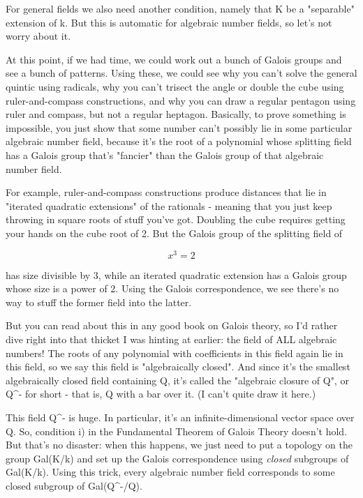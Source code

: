 For general fields we also need another condition, namely that K be a 
"separable" extension of k.  But this is automatic for algebraic number
fields, so let's not worry about it.  

At this point, if we had time, we could work out a bunch of Galois groups
and see a bunch of patterns.  Using these, we could see why you can't
solve the general quintic using radicals, why you can't trisect the angle 
or double the cube using ruler-and-compass constructions, and why you can
draw a regular pentagon using ruler and compass, but not a regular heptagon.
Basically, to prove something is impossible, you just show that some number
can't possibly lie in some particular algebraic number field, because it's 
the root of a polynomial whose splitting field has a Galois group that's 
"fancier" than the Galois group of that algebraic number field.  

For example, ruler-and-compass constructions produce distances that lie in 
"iterated quadratic extensions" of the rationals - meaning that you just 
keep throwing in square roots of stuff you've got.  Doubling the cube 
requires getting your hands on the cube root of 2.  But the Galois group 
of the splitting field of 

$$
x^{3} = 2
$$
    
has size divisible by 3, while an iterated quadratic extension has a Galois
group whose size is a power of 2.  Using the Galois correspondence, we see
there's no way to stuff the former field into the latter.

But you can read about this in any good book on Galois theory, so I'd rather
dive right into that thicket I was hinting at earlier: the field of ALL 
algebraic numbers!  The roots of any polynomial with coefficients in this 
field again lie in this field, so we say this field is "algebraically 
closed".  And since it's the smallest algebraically closed field containing 
Q, it's called the "algebraic closure of Q", or Q^{-} for short - that is, Q 
with a bar over it.  (I can't quite draw it here.)

This field Q^{-} is huge.  In particular, it's an infinite-dimensional vector 
space over Q.  So, condition i) in the Fundamental Theorem of Galois Theory 
doesn't hold.  But that's no disaster: when this happens, we just need to 
put a topology on the group Gal(K/k) and set up the Galois correspondence using
\emph{closed} subgroups of Gal(K/k).  Using this trick, every algebraic number field
corresponds to some closed subgroup of Gal(Q^{-}/Q).

